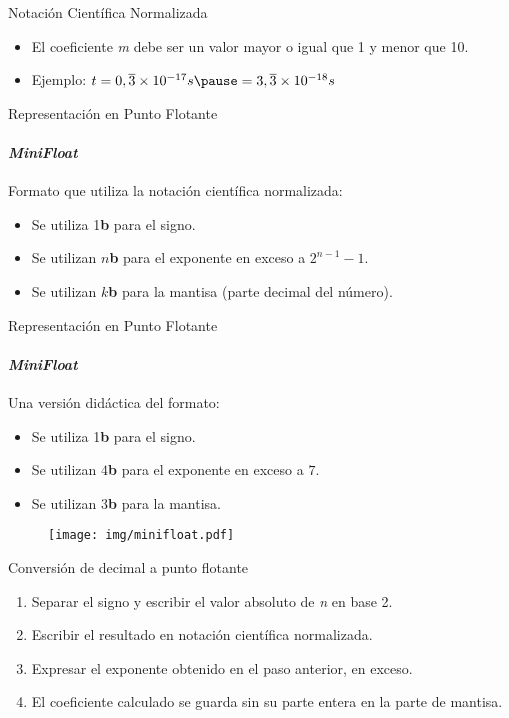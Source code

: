 \documentclass[11pt,a4paper,spanish]{beamer}
\newcommand{\bit}{\textbf{b}}
\begin{document}
\begin{frame}{Notación Científica Normalizada}
\begin{itemize}
    \item El coeficiente \textit{m} debe ser un valor mayor o igual que 1 y
        menor que 10.
    \pause
\item Ejemplo: $t = 0,\overline{3} \times 10^{-17}s\pause
    = 3,\overline{3} \times 10^{-18} s$
\end{itemize}
\end{frame}

\begin{frame}{Representación en Punto Flotante}
\framesubtitle{\emph{MiniFloat}}

Formato que utiliza la notación científica normalizada:

\begin{itemize}
    \item Se utiliza 1\bit{} para el signo.
    \item Se utilizan $n$\bit{} para el exponente en exceso a $2^{n-1}-1$.
    \item Se utilizan $k$\bit{} para la mantisa (parte decimal del número).
\end{itemize}

\end{frame}

\begin{frame}{Representación en Punto Flotante}
\framesubtitle{\emph{MiniFloat}}

Una versión didáctica del formato:

\begin{itemize}
    \item Se utiliza 1\bit{} para el signo.
    \item Se utilizan $4$\bit{} para el exponente en exceso a $7$.
    \item Se utilizan $3$\bit{} para la mantisa.
\end{itemize}

    \begin{figure}
    \centering
    \texttt{[image: img/minifloat.pdf]}
    \captionsetup{labelformat=empty}
    \caption{}
    \end{figure}
\end{frame}

\begin{frame}{Conversión de decimal a punto flotante}
\begin{enumerate}
    \item Separar el signo y escribir el valor absoluto de \textit{n} en base 2.
    \item Escribir el resultado en notación científica normalizada.
    \item Expresar el exponente obtenido en el paso anterior, en exceso.
    \item El coeficiente calculado se guarda sin su parte entera en la parte
        de mantisa.
\end{enumerate}
\end{frame}
\end{document}
